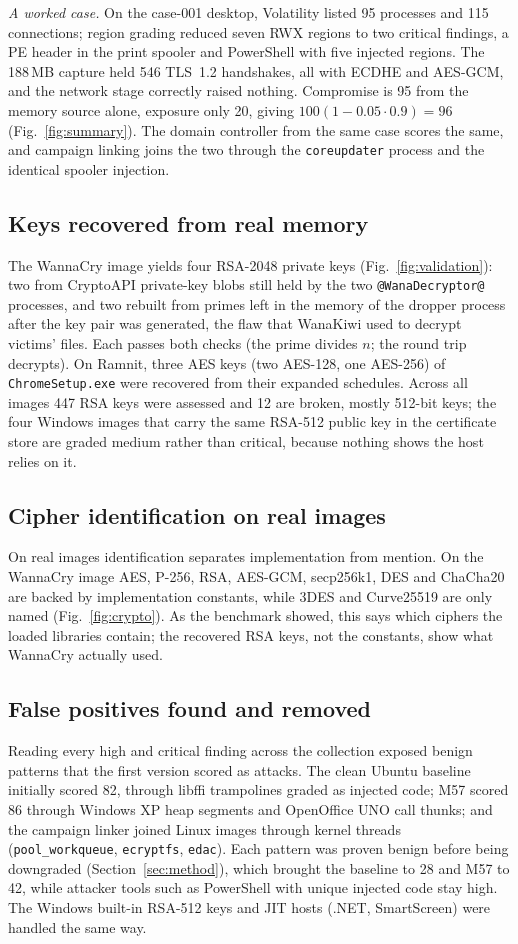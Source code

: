 \textit{A worked case.} On the case-001 desktop, Volatility listed 95 processes and 115 connections; region
grading reduced seven RWX regions to two critical findings, a PE header in the print spooler and PowerShell with
five injected regions. The 188\,MB capture held 546 TLS~1.2 handshakes, all with ECDHE and AES-GCM, and the network
stage correctly raised nothing. Compromise is 95 from the memory source alone, exposure only 20, giving
$100(1-0.05\cdot0.9)=96$ (Fig.~\ref{fig:summary}). The domain controller from the same case scores the same, and
campaign linking joins the two through the \texttt{coreupdater} process and the identical spooler injection.


\subsection{Keys recovered from real memory}
The WannaCry image yields four RSA-2048 private keys (Fig.~\ref{fig:validation}): two from CryptoAPI private-key
blobs still held by the two \texttt{@WanaDecryptor@} processes, and two rebuilt from primes left in the memory of
the dropper process after the key pair was generated, the flaw that WanaKiwi used to decrypt victims' files. Each
passes both checks (the prime divides $n$; the round trip decrypts). On Ramnit, three AES keys (two AES-128,
one AES-256) of \texttt{ChromeSetup.exe} were recovered from their expanded schedules. Across all images 447 RSA
keys were assessed and 12 are broken, mostly 512-bit keys; the four Windows images that carry the same RSA-512
public key in the certificate store are graded medium rather than critical, because nothing shows the host
relies on it.


\subsection{Cipher identification on real images}
On real images identification separates implementation from mention. On the WannaCry image AES, P-256, RSA,
AES-GCM, secp256k1, DES and ChaCha20 are backed by implementation constants, while 3DES and Curve25519 are only
named (Fig.~\ref{fig:crypto}). As the benchmark showed, this says which ciphers the loaded libraries contain;
the recovered RSA keys, not the constants, show what WannaCry actually used.


\subsection{False positives found and removed}
Reading every high and critical finding across the collection exposed benign patterns that the first version
scored as attacks. The clean Ubuntu baseline initially scored 82, through libffi trampolines graded as
injected code; M57 scored 86 through Windows XP heap segments and OpenOffice UNO call thunks; and the campaign
linker joined Linux images through kernel threads (\texttt{pool\_workqueue}, \texttt{ecryptfs},
\texttt{edac}). Each pattern was proven benign before being downgraded (Section~\ref{sec:method}), which
brought the baseline to 28 and M57 to 42, while attacker tools such as PowerShell with unique injected code
stay high. The Windows built-in RSA-512 keys and JIT hosts (.NET, SmartScreen) were handled the same way.

